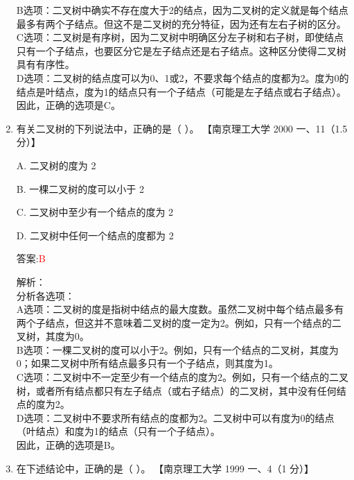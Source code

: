 \documentclass[lang=cn,newtx,10pt,scheme=chinese]{../../../elegantbook}
\begin{document}
\begin{enumerate}
    B选项：二叉树中确实不存在度大于2的结点，因为二叉树的定义就是每个结点最多有两个子结点。但这不是二叉树的充分特征，因为还有左右子树的区分。\\
    
    C选项：二叉树是有序树，因为二叉树中明确区分左子树和右子树，即使结点只有一个子结点，也要区分它是左子结点还是右子结点。这种区分使得二叉树具有有序性。\\
    
    D选项：二叉树的结点度可以为0、1或2，不要求每个结点的度都为2。度为0的结点是叶结点，度为1的结点只有一个子结点（可能是左子结点或右子结点）。\\
    
    因此，正确的选项是C。\\  

    \item 有关二叉树的下列说法中，正确的是（ ）。  
    【南京理工大学 2000 一、11（1.5 分）】  

    A. 二叉树的度为 2  

    B. 一棵二叉树的度可以小于 2  

    C. 二叉树中至少有一个结点的度为 2  

    D. 二叉树中任何一个结点的度都为 2  
    
    答案:\textcolor{red}{B}
    
    解析：\\
    分析各选项：\\
    A选项：二叉树的度是指树中结点的最大度数。虽然二叉树中每个结点最多有两个子结点，但这并不意味着二叉树的度一定为2。例如，只有一个结点的二叉树，其度为0。\\
    
    B选项：一棵二叉树的度可以小于2。例如，只有一个结点的二叉树，其度为0；如果二叉树中所有结点最多只有一个子结点，则其度为1。\\
    
    C选项：二叉树中不一定至少有一个结点的度为2。例如，只有一个结点的二叉树，或者所有结点都只有左子结点（或右子结点）的二叉树，其中没有任何结点的度为2。\\
    
    D选项：二叉树中不要求所有结点的度都为2。二叉树中可以有度为0的结点（叶结点）和度为1的结点（只有一个子结点）。\\
    
    因此，正确的选项是B。\\  

    \item 在下述结论中，正确的是（ ）。  
    【南京理工大学 1999 一、4（1 分）】 


\end{enumerate}
\end{document}
